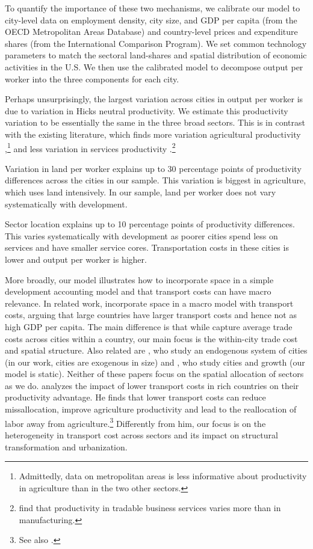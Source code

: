 \documentclass[12pt]{article}
\begin{document}
To quantify the importance of these two mechanisms, we calibrate our model to city-level data on employment density, city size, and GDP per capita (from the OECD Metropolitan Areas Database) and country-level prices and expenditure shares (from the International Comparison Program). We set common technology parameters to match the sectoral land-shares and spatial distribution of economic activities in the U.S. We then use the calibrated model to decompose output per worker into the three components for each city.

Perhaps unsurprisingly, the largest variation across cities in output per worker is due to variation in Hicks neutral productivity. We estimate this productivity variation to be essentially the same in the three broad sectors. This is in contrast with the existing literature, which finds more variation agricultural productivity \cite{Caselli05,Restuccia08},\footnote{Admittedly, data on metropolitan areas is less informative about productivity in agriculture than in the two other sectors.} and less variation in services productivity \cite{Balassa64,Samuelson64,Herrendorf2012-yg}.\footnote{ find that productivity in tradable business services varies more than in manufacturing.}

Variation in land per worker explains up to 30 percentage points of productivity differences across the cities in our sample. This variation is biggest in agriculture, which uses land intensively. In our sample, land per worker does not vary systematically with development.

Sector location explains up to 10 percentage points of productivity differences. This varies systematically with development as poorer cities spend less on services and have smaller service cores. Transportation costs in these cities is lower and output per worker is higher.

More broadly, our model illustrates how to incorporate space in a simple development accounting model and that transport costs can have macro relevance. In related work,  incorporate space in a macro model with transport costs, arguing that large countries have larger transport costs and hence not as high GDP per capita. The main difference is that while  capture average trade costs across cities within a country, our main focus is the within-city trade cost and spatial structure. Also related are , who study an endogenous system of cities (in our work, cities are exogenous in size) and , who study cities and growth (our model is static). Neither of these papers focus on the spatial allocation of sectors as we do.  analyzes the impact of lower transport costs in rich countries on their productivity advantage. He finds that lower transport costs can reduce missallocation, improve agriculture productivity and lead to the reallocation of labor away from agriculture.\footnote{See also .} Differently from him, our focus is on the heterogeneity in transport cost across sectors and its impact on structural transformation and urbanization.
\end{document}

